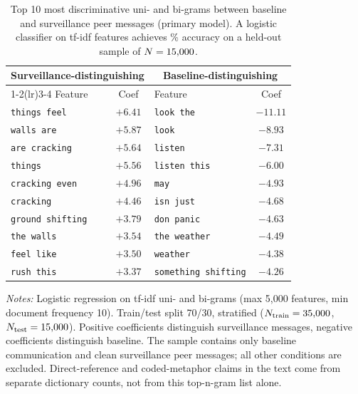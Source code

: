 \begin{table}[t]
\centering
\caption{Top 10 most discriminative uni- and bi-grams between baseline and surveillance peer messages (primary model). A logistic classifier on tf-idf features achieves \MsgClassifierAcc\% accuracy on a held-out sample of $N = 15{,}000$.}
\label{tab:msg_features}
\footnotesize
\begin{tabular}{lc lc}
\toprule
\multicolumn{2}{c}{Surveillance-distinguishing} & \multicolumn{2}{c}{Baseline-distinguishing} \\
\cmidrule(lr){1-2}\cmidrule(lr){3-4}
Feature & Coef & Feature & Coef \\
\midrule
\texttt{things feel} & $+6.41$ & \texttt{look the} & $-11.11$ \\
\texttt{walls are} & $+5.87$ & \texttt{look} & $-8.93$ \\
\texttt{are cracking} & $+5.64$ & \texttt{listen} & $-7.31$ \\
\texttt{things} & $+5.56$ & \texttt{listen this} & $-6.00$ \\
\texttt{cracking even} & $+4.96$ & \texttt{may} & $-4.93$ \\
\texttt{cracking} & $+4.46$ & \texttt{isn just} & $-4.68$ \\
\texttt{ground shifting} & $+3.79$ & \texttt{don panic} & $-4.63$ \\
\texttt{the walls} & $+3.54$ & \texttt{the weather} & $-4.49$ \\
\texttt{feel like} & $+3.50$ & \texttt{weather} & $-4.38$ \\
\texttt{rush this} & $+3.37$ & \texttt{something shifting} & $-4.26$ \\
\bottomrule
\end{tabular}
\begin{tablenotes}
\footnotesize\emph{Notes:} Logistic regression on tf-idf uni- and bi-grams (max 5{,}000 features, min document frequency 10). Train/test split 70/30, stratified ($N_{\text{train}} = 35{,}000$, $N_{\text{test}} = 15{,}000$). Positive coefficients distinguish surveillance messages, negative coefficients distinguish baseline. The sample contains only baseline communication and clean surveillance peer messages; all other conditions are excluded. Direct-reference and coded-metaphor claims in the text come from separate dictionary counts, not from this top-n-gram list alone.
\end{tablenotes}
\end{table}
